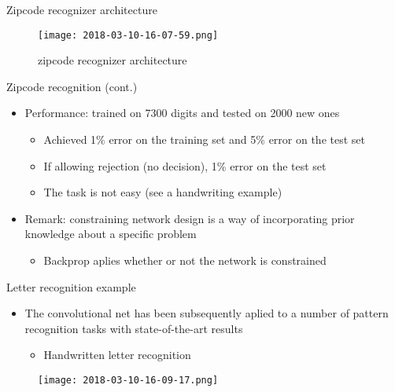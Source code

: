 \documentclass[notes]{beamer}
\providecommand{\tightlist}{%
  \setlength{\itemsep}{0pt}\setlength{\parskip}{0pt}}
\begin{document}
\begin{frame}{Zipcode recognizer architecture}

\begin{figure}
\centering
\texttt{[image: 2018-03-10-16-07-59.png]}
\caption{zipcode recognizer architecture}
\end{figure}

\end{frame}

\begin{frame}{Zipcode recognition (cont.)}

\begin{itemize}
\tightlist
\item
  Performance: trained on 7300 digits and tested on 2000 new ones

  \begin{itemize}
  \tightlist
  \item
    Achieved 1\% error on the training set and 5\% error on the test set
  \item
    If allowing rejection (no decision), 1\% error on the test set
  \item
    The task is not easy (see a handwriting example)
  \end{itemize}
\item
  Remark: constraining network design is a way of incorporating prior
  knowledge about a specific problem

  \begin{itemize}
  \tightlist
  \item
    Backprop aplies whether or not the network is constrained
  \end{itemize}
\end{itemize}

\end{frame}

\begin{frame}{Letter recognition example}

\begin{itemize}
\tightlist
\item
  The convolutional net has been subsequently aplied to a number of
  pattern recognition tasks with state-of-the-art results

  \begin{itemize}
  \tightlist
  \item
    Handwritten letter recognition
  \end{itemize}
\end{itemize}

\begin{figure}
\centering
\texttt{[image: 2018-03-10-16-09-17.png]}
\caption{}
\end{figure}

\end{frame}
\end{document}
